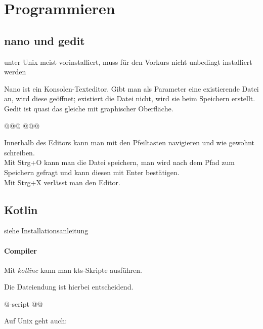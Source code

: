 \section{Programmieren}
\subsection{nano und gedit}
\begin{defBox}
     unter Unix meist vorinstalliert, muss für den Vorkurs nicht unbedingt installiert werden
\end{defBox}
Nano ist ein Konsolen-Texteditor. Gibt man als Parameter eine existierende Datei an, wird diese geöffnet; existiert die Datei nicht, wird sie beim Speichern erstellt. Gedit ist quasi das gleiche mit graphischer Oberfläche.
\begin{commandshell}
@\shellprefix@nano @\textit{}@
@\shellprefix@gedit @\textit{}@
\end{commandshell}
Innerhalb des Editors kann man mit den Pfeiltasten navigieren und wie gewohnt schreiben.\\
Mit Strg+O kann man die Datei speichern, man wird nach dem Pfad zum Speichern gefragt und kann diesen mit Enter bestätigen.\\
Mit Strg+X verlässt man den Editor.

\subsection{Kotlin}
\begin{defBox}
     siehe Installationsanleitung
\end{defBox}
\paragraph*{Compiler}\mbox{}

Mit \textit{kotlinc} kann man kts-Skripte ausführen.
\begin{defBox}
     Die Dateiendung ist hierbei entscheidend.
\end{defBox}

\begin{commandshell}
    @\shellprefix@kotlinc -script @\textit{}@
\end{commandshell}

Auf Unix geht auch:

